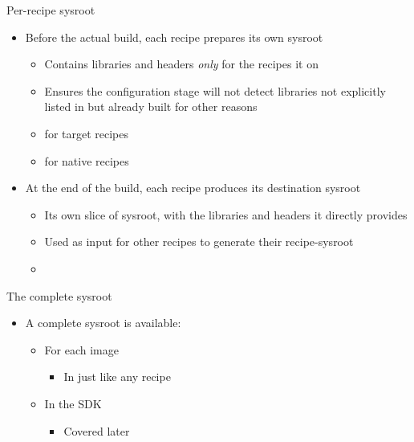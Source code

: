 \begin{frame}{Per-recipe sysroot}
  \begin{itemize}
    \item Before the actual build, each recipe prepares its own sysroot
      \begin{itemize}
        \item Contains libraries and headers {\em only} for the recipes it
           on
        \item Ensures the configuration stage will not detect libraries not
          explicitly listed in  but already built for other
          reasons
        \item {} for target recipes
        \item {} for native recipes
      \end{itemize}
    \item At the end of the build, each recipe produces its destination
      sysroot
      \begin{itemize}
        \item Its own slice of sysroot, with the libraries and headers it
          directly provides
        \item Used as input for other recipes to generate their
          recipe-sysroot
        \item {}
      \end{itemize}
  \end{itemize}
\end{frame}

\begin{frame}{The complete sysroot}
  \begin{itemize}
  \item A complete sysroot is available:
    \begin{itemize}
      \item For each image
        \begin{itemize}
          \item In  just like any recipe
        \end{itemize}
      \item In the SDK
        \begin{itemize}
          \item Covered later
        \end{itemize}
    \end{itemize}
  \end{itemize}
\end{frame}

